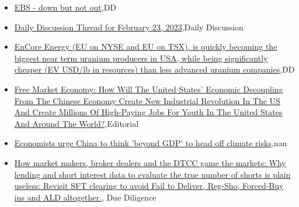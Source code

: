 \documentclass{article}%
\begin{document}
%
\begin{itemize}%
\item%
\href{https://reddit.com/r/wallstreetbets/comments/119wxek/ebs\_down\_but\_not\_out/}{EBS - down but not out},DD%
\item%
\href{https://reddit.com/r/wallstreetbets/comments/119uzsr/daily\_discussion\_thread\_for\_february\_23\_2023/}{Daily Discussion Thread for February 23, 2023},Daily Discussion%
\item%
\href{https://reddit.com/r/Baystreetbets/comments/119wfmu/encore\_energy\_eu\_on\_nyse\_and\_eu\_on\_tsx\_is\_quickly/}{EnCore Energy (EU on NYSE and EU on TSX), is quickly becoming the biggest near term uranium producers in USA, while being significantly cheaper (EV USD/lb in resources) than less advanced uranium companies},DD%
\item%
\href{https://reddit.com/r/Economics/comments/119pyeo/free\_market\_economy\_how\_will\_the\_united\_states/}{Free Market Economy: How Will The United States' Economic Decoupling From The Chinese Economy Create New Industrial Revolution In The US And Create Millions Of High-Paying Jobs For Youth In The United States And Around The World?},Editorial%
\item%
\href{https://reddit.com/r/Economics/comments/119p86m/economists\_urge\_china\_to\_think\_beyond\_gdp\_to\_head/}{Economists urge China to think 'beyond GDP' to head off climate risks},nan%
\item%
\href{https://reddit.com/r/Superstonk/comments/119vxz9/how\_market\_makers\_broker\_dealers\_and\_the\_dtcc/}{How market makers, broker dealers and the DTCC game the markets: Why lending and short interest data to evaluate the true number of shorts is plain useless: Revisit SFT clearing to avoid Fail to Deliver, Reg-Sho, Forced-Buy ins and ALD altogether.}, Due Diligence%
\end{itemize}%
\end{document}
